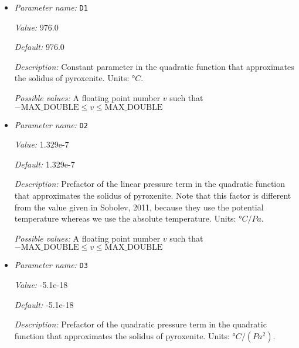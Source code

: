 \begin{itemize}
{\it Value:} 5.124e-12


{\it Default:} 5.124e-12


{\it Description:} The value of the compressibility $\kappa$. Units: $1/Pa$.


{\it Possible values:} A floating point number $v$ such that $0 \leq v \leq \text{MAX\_DOUBLE}$
\item {\it Parameter name:} {\tt D1}
\label{parameters:Material model/Latent heat melt/D1}
\label{parameters:Material_20model/Latent_20heat_20melt/D1}


{\it Value:} 976.0


{\it Default:} 976.0


{\it Description:} Constant parameter in the quadratic function that approximates the solidus of pyroxenite. Units: $°C$.


{\it Possible values:} A floating point number $v$ such that $-\text{MAX\_DOUBLE} \leq v \leq \text{MAX\_DOUBLE}$
\item {\it Parameter name:} {\tt D2}
\label{parameters:Material model/Latent heat melt/D2}
\label{parameters:Material_20model/Latent_20heat_20melt/D2}


{\it Value:} 1.329e-7


{\it Default:} 1.329e-7


{\it Description:} Prefactor of the linear pressure term in the quadratic function that approximates the solidus of pyroxenite. Note that this factor is different from the value given in Sobolev, 2011, because they use the potential temperature whereas we use the absolute temperature. Units: $°C/Pa$.


{\it Possible values:} A floating point number $v$ such that $-\text{MAX\_DOUBLE} \leq v \leq \text{MAX\_DOUBLE}$
\item {\it Parameter name:} {\tt D3}
\label{parameters:Material model/Latent heat melt/D3}
\label{parameters:Material_20model/Latent_20heat_20melt/D3}


{\it Value:} -5.1e-18


{\it Default:} -5.1e-18


{\it Description:} Prefactor of the quadratic pressure term in the quadratic function that approximates the solidus of pyroxenite. Units: $°C/(Pa^2)$.



\end{itemize}
